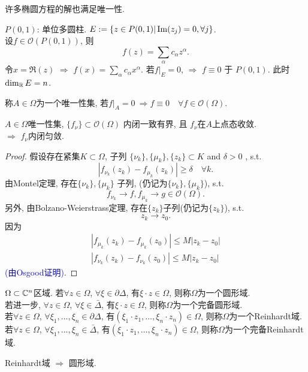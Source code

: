 \begin{remark}
   许多椭圆方程的解也满足唯一性. 
\end{remark}

\begin{example}
  $P(0,1)$: 单位多圆柱.
  $E:=\{z\in P(0,1)|\operatorname{Im} (z_j)=0, \forall j\}$.\\
   设$f \in \mathcal{O}(P(0,1))$, 则
   $$ f(z)=\sum_{\alpha }c_\alpha z^\alpha  .$$ 
   令$x=\Re (z)$ $\Rightarrow $ $f(x)=\sum_\alpha c_\alpha x^\alpha .$  若$f|_E=0$, $\Rightarrow $ $f \equiv 0$ 于 $P(0,1)$. 此时$\dim_{{\mathbb R}} E=n$.  
\end{example}

\begin{definition}
  称$A\in \Omega $为一个唯一性集, 若$f|_A=0 ~ \Rightarrow f \equiv 0 \quad \forall f \in \mathcal{O}(\Omega ).$
\end{definition}

\begin{theorem}[Vitali]
    $A\in \Omega $唯一性集, $\{f_\nu \} \subset \mathcal{O}(\Omega )$ 内闭一致有界, 且 $f_\nu $在$A$上点态收敛.\\
    $\Rightarrow $ $f_\nu $内闭匀敛.   
\end{theorem}
\begin{proof}
  假设存在紧集$K \subset \Omega $, 子列 $\{\nu _k\}, \{\mu _k\}, \{z_k\} \subset K$ and $\delta >0$ , s.t.
  $$ |f_{\nu _k}(z_k) -f_{\mu _k}(z_k) | \geq \delta \quad \forall k .$$ 
  由Montel定理, 存在$\{\nu _k\}, \{\mu _k\}$ 子列, (仍记为$\{\nu _k\}, \{\mu _k\} $), s.t. 
  $$ f_{\nu _k} \to f, f_{\mu _k} \to g \in \mathcal{O}(\Omega ).$$
  另外, 由Bolzano-Weierstrass定理, 存在$\{z_k\}$子列(仍记为$\{z_k\}$), s.t. 
  $$ z_k \to z_0. $$
  因为
  \begin{align*}
    |f_{\mu _k}(z_k) -f_{\mu _k}(z_0) | \leq M|z_k-z_0| \\
    |f_{\nu _k}(z_k) -f_{\nu _k}(z_0) | \leq M|z_k-z_0|
  \end{align*} 
  \textcolor{blue}{(由Osgood证明)}.
\end{proof}

\begin{definition}
  $\Omega \subset {\mathbb C}^n$区域.  若$\forall z \in \Omega $, $\forall \xi \in \partial \Delta $, 有$\xi \cdot z \in \Omega $, 则称$\Omega $为一个圆形域.\\
  若进一步, $\forall z \in \Omega $, $\forall \xi \in \bar \Delta $, 有$\xi \cdot z \in \Omega $, 则称$\Omega $为一个完备圆形域.\\
  若$\forall z \in \Omega $, $\forall \xi_1,\dots,\xi _n \in \partial \Delta $, 有$(\xi_1 \cdot z_1,\dots,\xi_n \cdot z_n) \in \Omega $, 则称$\Omega $为一个Reinhardt域.\\
  若$\forall z \in \Omega $, $\forall \xi_1,\dots,\xi _n \in \bar \Delta $, 有$(\xi_1 \cdot z_1,\dots,\xi_n \cdot z_n) \in \Omega $, 则称$\Omega $为一个完备Reinhardt域.
\end{definition}
\begin{remark}
  Reinhardt域 $\Rightarrow $  圆形域.
\end{remark}

